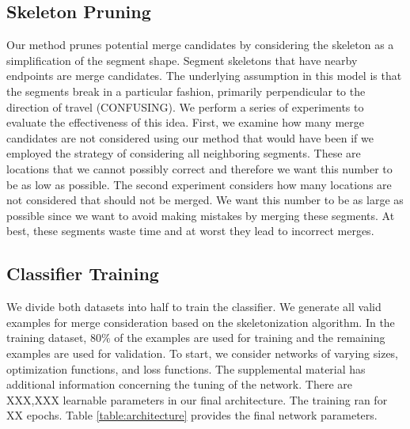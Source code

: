 \subsection{Skeleton Pruning}

Our method prunes potential merge candidates by considering the skeleton as a simplification of the segment shape. Segment skeletons that have nearby endpoints are merge candidates. The underlying assumption in this model is that the segments break in a particular fashion, primarily perpendicular to the direction of travel (CONFUSING). We perform a series of experiments to evaluate the effectiveness of this idea. First, we examine how many merge candidates are not considered using our method that would have been if we employed the strategy of considering all neighboring segments. These are locations that we cannot possibly correct and therefore we want this number to be as low as possible. The second experiment considers how many locations are not considered that should not be merged. We want this number to be as large as possible since we want to avoid making mistakes by merging these segments. At best, these segments waste time and at worst they lead to incorrect merges. %
\subsection{Classifier Training}

We divide both datasets into half to train the classifier. We generate all valid examples for merge consideration based on the skeletonization algorithm. In the training dataset, $80\%$ of the examples are used for training and the remaining examples are used for validation. To start, we consider networks of varying sizes, optimization functions, and loss functions. The supplemental material has additional information concerning the tuning of the network. There are XXX,XXX learnable parameters in our final architecture. The training ran for XX epochs. Table \ref{table:architecture} provides the final network parameters.


